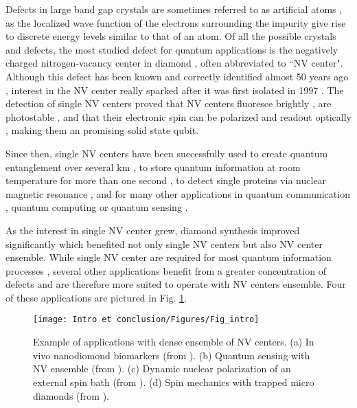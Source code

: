 \documentclass[a4paper, 11pt]{report}
\begin{document}
Defects in large band gap crystals are sometimes referred to as artificial atoms \citep{buluta2011natural}, as the localized wave function of the electrons surrounding the impurity give rise to discrete energy levels similar to that of an atom. Of all the possible crystals and defects, the most studied defect for quantum applications is the negatively charged nitrogen-vacancy center in diamond \citep{aharonovich2016solid, de2021materials}, often abbreviated to ``NV center". Although this defect has been known and correctly identified almost 50 years ago \citep{davies1976optical}, interest in the NV center really sparked after it was first isolated in 1997 \citep{gruber1997scanning}. The detection of single NV centers proved that NV centers fluoresce brightly \citep{gruber1997scanning}, are photostable \citep{kurtsiefer2000stable}, and that their electronic spin can be polarized and readout optically \citep{jelezko2004observation}, making them an promising solid state qubit.

Since then, single NV centers have been successfully used to create quantum entanglement over several km \citep{hensen2015loophole}, to store quantum information at room temperature for more than one second \citep{maurer2012room}, to detect single proteins via nuclear magnetic resonance \citep{lovchinsky2016nuclear}, and for many other applications in quantum communication \citep{wehner2018quantum}, quantum computing \citep{de2021materials} or quantum sensing \citep{degen2017quantum}.

As the interest in single NV center grew, diamond synthesis improved significantly \citep{achard2020chemical, barry2020sensitivity, edmonds2020generation} which benefited not only single NV centers but also NV center ensemble. While single NV center are required for most quantum information processes \citep{ladd2010quantum}, several other applications benefit from a greater concentration of defects and are therefore more suited to operate with NV centers ensemble. Four of these applications are pictured in Fig. \ref{shema introduction}.

\begin{figure}[h!]
\centering
\texttt{[image: Intro et conclusion/Figures/Fig\_intro]}
\caption{Example of applications with dense ensemble of NV centers. (a) In vivo nanodiomond biomarkers (from \citep{mohan2010vivo}). (b) Quantum sensing with NV ensemble (from \citep{ku2020imaging}). (c) Dynamic nuclear polarization of an external spin bath (from \citep{healey2021polarization}). (d) Spin mechanics with trapped micro diamonds (from \citep{delord2020spin}).}
\label{shema introduction}
\end{figure}
\end{document}
